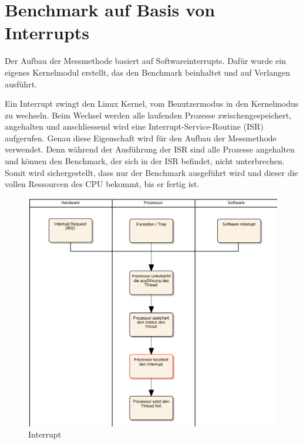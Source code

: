 
\section{Benchmark auf Basis von Interrupts}
\label{chap:benchmark_basis_interrupts}



Der Aufbau der Messmethode basiert auf Softwareinterrupts. Dafür wurde ein eigenes Kernel\-modul erstellt, das den Benchmark beinhaltet und auf Verlangen ausführt.
\par
Ein Interrupt zwingt den Linux Kernel, vom Benutzermodus in den Kernelmodus zu wechseln\cite{Mandl2010_3}. Beim Wechsel werden alle laufenden Prozesse zwischengespeichert, angehalten und anschliessend wird eine Interrupt-Service-Routine (ISR) aufgerufen. Genau diese Eigenschaft wird für den Aufbau der Messmethode verwendet. Denn während der Ausführung der ISR sind alle Prozesse angehalten und können den Benchmark, der sich in der ISR befindet, nicht unterbrechen. Somit wird sichergestellt, dass nur der Benchmark ausgeführt wird und dieser die vollen Ressourcen des CPU bekommt, bis er fertig ist.
\par

\begin{figure}
\centering
\includegraphics[scale=0.45]{images/interrupt_ea.pdf}
\caption{Interrupt}
\label{fig:Interrupt}
\end{figure}

